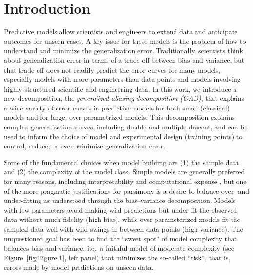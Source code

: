\documentclass[twocolumn,aps,prx,superscriptaddress,10pt]{revtex4-2}
\newcommand{\0}{\bm{0}}
\begin{document}
\maketitle

\section{Introduction}
\label{sec:introduction}

Predictive models allow scientists and engineers to extend data and anticipate outcomes for unseen cases.  A key issue for these models is the problem of how to understand and minimize the generalization error.  Traditionally, scientists think about generalization error in terms of a trade-off between bias and variance, but that trade-off does not readily predict the error curves for many models, especially models with more parameters than data points and models involving highly structured scientific and engineering data.   In this work, we introduce a new decomposition, the \emph{generalized aliasing decomposition (GAD)}, that explains a wide variety of error curves in predictive models for both small (classical) models and for large, over-parametrized models.  This decomposition explains complex generalization curves, including double and multiple descent, and can be used to inform the choice of model and experimental design (training points) to control, reduce, or even minimize generalization error.

Some of the fundamental choices when model building are (1) the sample data and (2) the complexity of the model class.
Simple models are generally preferred for many reasons, including interpretability and computational expense 
\cite{goldenfeld1999simple,hoel2013quantifyin,crutchfield2014dreams,transtrum2015perspective,mattingly2018maximizing,chvykov2021causal,quinn2022information}, but one of the more pragmatic justifications for parsimony is a desire to balance over- and under-fitting as understood through the bias--variance decomposition.
Models with few parameters avoid making wild predictions but under fit the observed data without much fidelity (high bias), while over-parameterized models fit the sampled data well with wild swings in between data points (high variance).
The unquestioned goal has been to find the ``sweet spot'' of model complexity that balances bias and variance, i.e., a faithful model of moderate complexity (see Figure~\ref{fig:Figure 1}, left panel) that minimizes the so-called ``risk'', that is, errors made by model predictions on unseen data.
\end{document}
